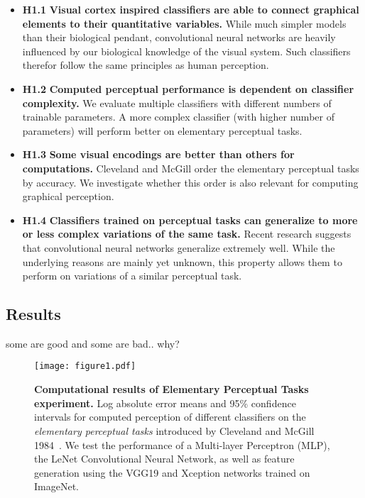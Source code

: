 \begin{itemize}
	\item \textbf{H1.1} \textbf{Visual cortex inspired classifiers are able to connect graphical elements to their quantitative variables.} While much simpler models than their biological pendant, convolutional neural networks are heavily influenced by our biological knowledge of the visual system. Such classifiers therefor follow the same principles as human perception.
	\item \textbf{H1.2} \textbf{Computed perceptual performance is dependent on classifier complexity.} We evaluate multiple classifiers with different numbers of trainable parameters. A more complex classifier (with higher number of parameters) will perform better on elementary perceptual tasks.
	\item \textbf{H1.3} \textbf{Some visual encodings are better than others for computations.} Cleveland and McGill order the elementary perceptual tasks by accuracy. We investigate whether this order is also relevant for computing graphical perception.
	\item \textbf{H1.4} \textbf{Classifiers trained on perceptual tasks can generalize to more or less complex variations of the same task.} Recent research suggests that convolutional neural networks generalize extremely well. While the underlying reasons are mainly yet unknown, this property allows them to perform on variations of a similar perceptual task.
\end{itemize}

\subsection{Results}


some are good and some are bad.. why?

\begin{figure*}[h]
	\centering
	  \texttt{[image: figure1.pdf]}
  \caption{\textbf{Computational results of Elementary Perceptual Tasks experiment.} Log absolute error means and 95\% confidence intervals for computed perception of different classifiers on the \emph{elementary perceptual tasks} introduced by Cleveland and McGill 1984~\cite{cleveland_mcgill}. We test the performance of a Multi-layer Perceptron (MLP), the LeNet Convolutional Neural Network, as well as feature generation using the VGG19 and Xception networks trained on ImageNet.}
	\label{fig:figure1_results}
\end{figure*}

